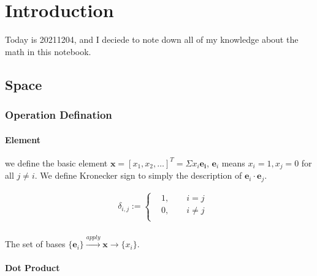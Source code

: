 

\chapter{Introduction}
Today is 20211204, and I deciede to note down all of my knowledge about the math in this notebook.


\section{Space}

\subsection{Operation Defination}

\subsubsection{Element}

we define the basic element $\boldsymbol x = [x_1, x_2,\dots]^T = \Sigma x_i \boldsymbol{e_i}$, $ \boldsymbol e_i $ means $x_i = 1, x_j = 0$ for all $j \neq i$. We define Kronecker sign to simply the description of $\boldsymbol e_i \cdot \boldsymbol e_j $.

\begin{equation}
    \begin{split}
    &\delta _{i,j}:=
    \begin{cases}
    &1,\qquad i = j\\
    &0,\qquad i \neq j\\
    \end{cases}\\
    \end{split}
\end{equation}

The set of bases $\{ \boldsymbol e_i  \}  \stackrel{apply}{\longrightarrow} \boldsymbol{x} \longrightarrow    \{ x_i \}    $.




\subsubsection{Dot Product}

